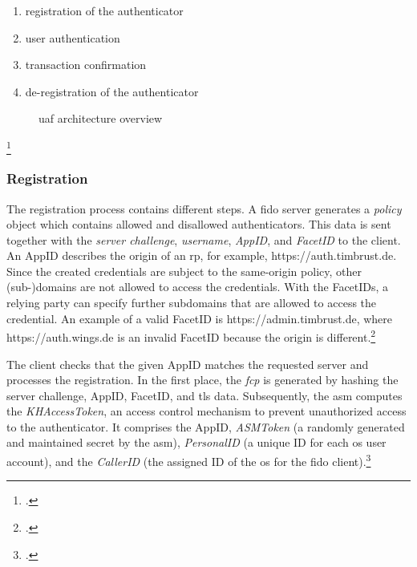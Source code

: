 \begin{enumerate}
	\item registration of the authenticator
	\item user authentication
	\item transaction confirmation
	\item de-registration of the authenticator
\end{enumerate}

\begin{figure}[hbt]
	\centering
	
	\caption[\gls{uaf} architecture overview]{\gls{uaf} architecture overview\footnotemark}
	\label{fig:uaf_architecture}
\end{figure}
\footcitetext[Source: diagram by author, based on][4]{uaf-overview}

\subsubsection{Registration}

The registration process contains different steps. A \gls{fido} server generates a \textit{policy} object which contains allowed and disallowed authenticators. This data is sent together with the \textit{server challenge}, \textit{username}, \textit{AppID}, and \textit{FacetID} to the client. An AppID describes the origin of an \gls{rp}, for example, \frqq https://auth.timbrust.de\flqq. Since the created credentials are subject to the same-origin policy, other (sub-)domains are not allowed to access the credentials. With the FacetIDs, a relying party can specify further subdomains that are allowed to access the credential. An example of a valid FacetID is \frqq https://admin.timbrust.de\flqq, where \frqq https://auth.wings.de\flqq{} is an invalid FacetID because the origin is different.\footcites[See][131--132]{10.1007/978-3-319-67639-5_11}[See][17--19]{uaf-protocol}[See][3--4]{uaf-appid-facets}

The client checks that the given AppID matches the requested server and processes the registration. In the first place, the \textit{\gls{fcp}} is generated by hashing the server challenge, AppID, FacetID, and \gls{tls} data. Subsequently, the \gls{asm} computes the \textit{KHAccessToken}, an access control mechanism to prevent unauthorized access to the authenticator. It comprises the AppID, \textit{ASMToken} (a randomly generated and maintained secret by the \gls{asm}), \textit{PersonalID} (a unique ID for each \gls{os} user account), and the \textit{CallerID} (the assigned ID of the \gls{os} for the \gls{fido} client).\footcites[See][131--132]{10.1007/978-3-319-67639-5_11}[See][17--19]{uaf-protocol}

